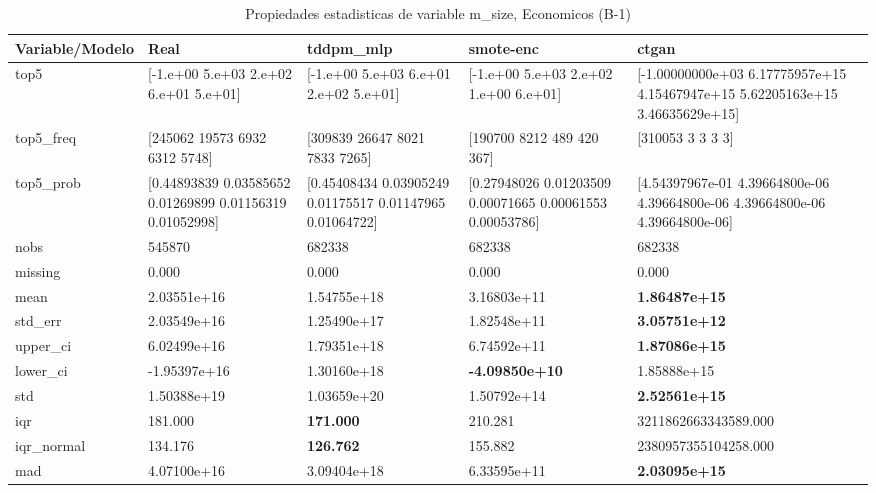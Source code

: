 \begin{table}[H]
\centering
\fontsize{8}{14}\selectfont
\caption{Propiedades  estadisticas de variable m\_size, Economicos (B-1)}
\label{table-stats-economicos-b-1-m_size}
\begin{tabular}{|l|m{10em}|m{10em}|m{10em}|m{10em}|}
\hline
 \rowcolor[gray]{0.8}
Variable/Modelo & Real & tddpm\_mlp & smote-enc & ctgan \\
\hline top5 & [-1.e+00  5.e+03  2.e+02  6.e+01  5.e+01] & [-1.e+00  5.e+03  6.e+01  2.e+02  5.e+01] & [-1.e+00  5.e+03  2.e+02  1.e+00  6.e+01] & [-1.00000000e+03  6.17775957e+15  4.15467947e+15  5.62205163e+15
  3.46635629e+15] \\
\hline top5\_freq & [245062  19573   6932   6312   5748] & [309839  26647   8021   7833   7265] & [190700   8212    489    420    367] & [310053      3      3      3      3] \\
\hline top5\_prob & [0.44893839 0.03585652 0.01269899 0.01156319 0.01052998] & [0.45408434 0.03905249 0.01175517 0.01147965 0.01064722] & [0.27948026 0.01203509 0.00071665 0.00061553 0.00053786] & [4.54397967e-01 4.39664800e-06 4.39664800e-06 4.39664800e-06
 4.39664800e-06] \\
\hline nobs & 545870 & 682338 & 682338 & 682338 \\
\hline missing & 0.000 & 0.000 & 0.000 & 0.000 \\
\hline mean & 2.03551e+16 & \cellcolor[rgb]{0.9, 0.54, 0.52} 1.54755e+18 & 3.16803e+11 & \bfseries 1.86487e+15 \\
\hline std\_err & 2.03549e+16 & \cellcolor[rgb]{0.9, 0.54, 0.52} 1.25490e+17 & 1.82548e+11 & \bfseries 3.05751e+12 \\
\hline upper\_ci & 6.02499e+16 & \cellcolor[rgb]{0.9, 0.54, 0.52} 1.79351e+18 & 6.74592e+11 & \bfseries 1.87086e+15 \\
\hline lower\_ci & -1.95397e+16 & \cellcolor[rgb]{0.9, 0.54, 0.52} 1.30160e+18 & \bfseries -4.09850e+10 & 1.85888e+15 \\
\hline std & 1.50388e+19 & \cellcolor[rgb]{0.9, 0.54, 0.52} 1.03659e+20 & 1.50792e+14 & \bfseries 2.52561e+15 \\
\hline iqr & 181.000 & \bfseries 171.000 & 210.281 & \cellcolor[rgb]{0.9, 0.54, 0.52} 3211862663343589.000 \\
\hline iqr\_normal & 134.176 & \bfseries 126.762 & 155.882 & \cellcolor[rgb]{0.9, 0.54, 0.52} 2380957355104258.000 \\
\hline mad & 4.07100e+16 & \cellcolor[rgb]{0.9, 0.54, 0.52} 3.09404e+18 & 6.33595e+11 & \bfseries 2.03095e+15 \\

\end{tabular}
\end{table}
